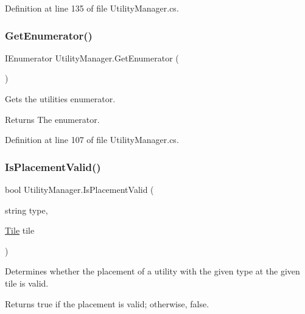 Definition at line 135 of file Utility\+Manager.\+cs.

\mbox{\label{class_utility_manager_a38b4a23270b7a6955e1bf0c66037dd1b}} 
\subsubsection{\texorpdfstring{Get\+Enumerator()}{GetEnumerator()}}
{\footnotesize\ttfamily I\+Enumerator Utility\+Manager.\+Get\+Enumerator (\begin{DoxyParamCaption}{ }\end{DoxyParamCaption})}



Gets the utilities enumerator. 

\begin{DoxyReturn}{Returns}
The enumerator.
\end{DoxyReturn}


Definition at line 107 of file Utility\+Manager.\+cs.

\mbox{\label{class_utility_manager_a617ae33d8a98a4c831036acfb91ccb8a}} 
\subsubsection{\texorpdfstring{Is\+Placement\+Valid()}{IsPlacementValid()}}
{\footnotesize\ttfamily bool Utility\+Manager.\+Is\+Placement\+Valid (\begin{DoxyParamCaption}\item[{string}]{type,  }\item[{\hyperlink{class_tile}{Tile}}]{tile }\end{DoxyParamCaption})}



Determines whether the placement of a utility with the given type at the given tile is valid. 

\begin{DoxyReturn}{Returns}
{\ttfamily true} if the placement is valid; otherwise, {\ttfamily false}.
\end{DoxyReturn}

